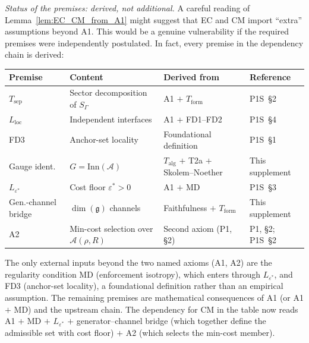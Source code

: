 \documentclass[11pt,a4paper]{article}
\theoremstyle{definition}
\begin{document}
\noindent\textit{Status of the premises: derived, not additional.}\quad
A careful reading of Lemma~\ref{lem:EC_CM_from_A1} might suggest that
EC and CM import ``extra'' assumptions beyond A1.  This would be a
genuine vulnerability if the required premises were independently
postulated.  In fact, every premise in the dependency chain is derived:
\begin{center}\small
\renewcommand{\arraystretch}{1.15}
\begin{tabular}{@{}p{3.0cm}p{3.5cm}p{3.5cm}p{2.5cm}@{}}
\toprule
\textbf{Premise} & \textbf{Content} & \textbf{Derived from} & \textbf{Reference} \\
\midrule
$T_{\mathrm{sep}}$ & Sector decomposition of $S_\Gamma$ &
  A1 $+$ $T_{\mathrm{form}}$ & P1S~\S2 \\
$L_{\mathrm{loc}}$ & Independent interfaces &
  A1 $+$ FD1--FD2 & P1S~\S4 \\
FD3 & Anchor-set locality &
  Foundational definition & P1S~\S1 \\
Gauge ident. & $G = \mathrm{Inn}(\mathcal{A})$ &
  $T_{\mathrm{alg}}$ $+$ T2a $+$ Skolem--Noether & This supplement \\
$L_{\varepsilon^*}$ & Cost floor $\varepsilon^* > 0$ &
  A1 $+$ MD & P1S~\S3 \\
Gen.-channel bridge & $\dim(\mathfrak{g})$ channels &
  Faithfulness $+$ $T_{\mathrm{form}}$ & This supplement \\
A2 & Min-cost selection over $\mathcal{A}(\rho, R)$ &
  Second axiom (P1, \S2) & P1, \S2; P1S~\S2 \\
\bottomrule
\end{tabular}
\end{center}
\noindent The only external inputs beyond the two named axioms (A1, A2)
are the regularity condition MD (enforcement isotropy), which enters
through $L_{\varepsilon^*}$, and FD3 (anchor-set locality), a
foundational definition rather than an empirical assumption.  The
remaining premises are mathematical consequences of A1 (or A1 $+$ MD)
and the upstream chain.  The dependency for CM in the table now reads
A1 $+$ MD $+$ $L_{\varepsilon^*}$ $+$ generator--channel bridge (which
together define the admissible set with cost floor) $+$ A2 (which
selects the min-cost member).
\end{document}
